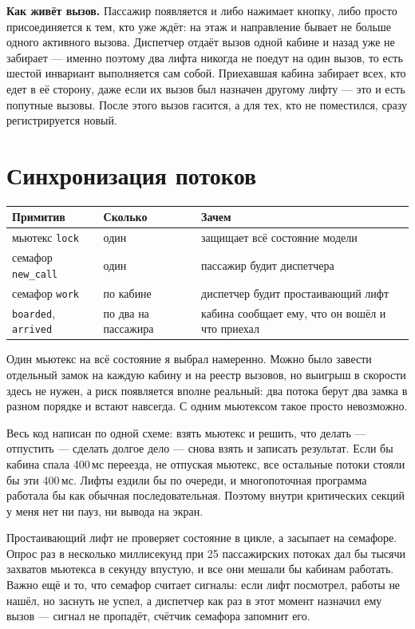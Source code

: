 \documentclass[12pt,a4paper]{article}
\begin{document}
\textbf{Как живёт вызов.} Пассажир появляется и либо нажимает кнопку,
либо просто присоединяется к тем, кто уже ждёт: на этаж и направление
бывает не больше одного активного вызова. Диспетчер отдаёт вызов одной
кабине и назад уже не забирает --- именно поэтому два лифта никогда не
поедут на один вызов, то есть шестой инвариант выполняется сам собой.
Приехавшая кабина забирает всех, кто едет в её сторону, даже если их
вызов был назначен другому лифту --- это и есть попутные вызовы. После
этого вызов гасится, а для тех, кто не поместился, сразу регистрируется
новый.

\section{Синхронизация потоков}

\begin{center}
\begin{tabular}{@{}p{36mm}p{26mm}p{74mm}@{}}
\textbf{Примитив} & \textbf{Сколько} & \textbf{Зачем} \\
\hline
мьютекс \verb|lock| & один & защищает всё состояние модели \\
семафор \verb|new_call| & один & пассажир будит диспетчера \\
семафор \verb|work| & по кабине & диспетчер будит простаивающий лифт \\
\verb|boarded|, \verb|arrived| & по два на пассажира & кабина сообщает
ему, что он вошёл и что приехал \\
\hline
\end{tabular}
\end{center}

Один мьютекс на всё состояние я выбрал намеренно. Можно было завести
отдельный замок на каждую кабину и на реестр вызовов, но выигрыш в
скорости здесь не нужен, а риск появляется вполне реальный: два потока
берут два замка в разном порядке и встают навсегда. С одним мьютексом
такое просто невозможно.

Весь код написан по одной схеме: взять мьютекс и решить, что делать ---
отпустить --- сделать долгое дело --- снова взять и записать результат.
Если бы кабина спала 400\,мс переезда, не отпуская мьютекс, все остальные
потоки стояли бы эти 400\,мс. Лифты ездили бы по очереди, и
многопоточная программа работала бы как обычная последовательная. Поэтому
внутри критических секций у меня нет ни пауз, ни вывода на экран.

Простаивающий лифт не проверяет состояние в цикле, а засыпает на
семафоре. Опрос раз в несколько миллисекунд при 25 пассажирских потоках
дал бы тысячи захватов мьютекса в секунду впустую, и все они мешали бы
кабинам работать. Важно ещё и то, что семафор считает сигналы: если лифт
посмотрел, работы не нашёл, но заснуть не успел, а диспетчер как раз в
этот момент назначил ему вызов --- сигнал не пропадёт, счётчик семафора
запомнит его.
\end{document}
